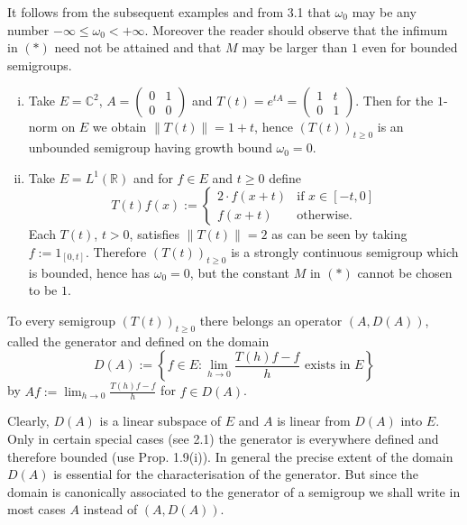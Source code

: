 It follows from the subsequent examples and from 3.1 that $\omega_{0}$ may be any number $-\infty \leq \omega_{0} < +\infty$.
Moreover the reader should observe that the infimum in $ (*) $ need not be attained and that $M$ may be larger than $ 1 $ even for bounded semigroups.
\begin{example}
\begin{enumerate}[(i)]
\item
Take $E = \mathbb{C}^{2}$, $A = \begin{pmatrix} 0 & 1 \\ 0 & 0 \end{pmatrix}$ and $T(t) = e^{tA} = \begin{pmatrix} 1 & t \\ 0 & 1 \end{pmatrix}$.
Then for the $1$-norm on $E$ we obtain $\|T(t)\| = 1 + t$, hence $(T(t))_{t \geq 0}$ is an unbounded semigroup having growth bound $\omega_{0} = 0$.

\item
Take $E = L^{1}(\mathbb{R})$ and for $f \in E$ and $t \geq 0$ define
\[
	T(t)f(x) := \begin{cases}
		2 \cdot f(x+t) & \text{if } x \in [-t,0] \\
		f(x+t) & \text{otherwise.}
\end{cases}
\]
Each $T(t)$, $t > 0$, satisfies $\|T(t)\| = 2$ as can be seen by taking $f := 1_{[0,t]}$.
Therefore $(T(t))_{t \geq 0}$ is a strongly continuous semigroup which is bounded, hence has $\omega_{0} = 0$, but the constant $M$ in $ (*) $ cannot be chosen to be $ 1 $.

\end{enumerate}
\end{example}
\begin{definition}
To every semigroup $(T(t))_{t \geq 0}$ there belongs an operator $(A,D(A))$, called the generator and defined on the domain
\[
D(A) := \left\{f \in E \colon \lim_{h \to 0} \frac{T(h)f-f}{h} \text{ exists in } E\right\}
\]
by $Af := \lim_{h \to 0} \frac{T(h)f-f}{h}$ for $f \in D(A)$.
\end{definition}
Clearly, $D(A)$ is a linear subspace of $E$ and $A$ is linear from $D(A)$ into $E$.
Only in certain special cases (see 2.1) the generator is everywhere defined and therefore bounded (use Prop. 1.9(i)).
In general the precise extent of the domain $D(A)$ is essential for the characterisation of the generator.
But since the domain is canonically associated to the generator of a semigroup we shall write in most cases $A$ instead of $(A,D(A))$.
